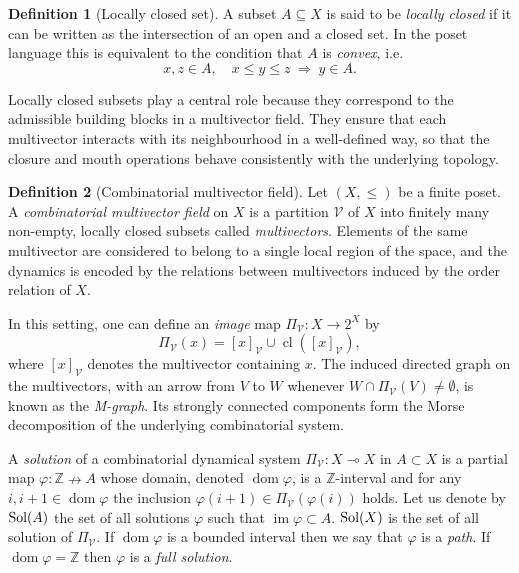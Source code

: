 \documentclass{article}
\theoremstyle{definition}
\newtheorem{definition}{Definition}
\theoremstyle{plain}
\theoremstyle{remark}
\newcommand{\1}{\mathbbm{1}}  %
\newcommand{\img}{\operatorname{im}}
\def\mathobj#1{\mbox{$#1$}}
\def\ZZ{\mathobj{\mathbb{Z}}}
\newcommand{\dom}{\operatorname{dom}}
\def\cV{\text{$\mathcal V$}}
\begin{document}
\begin{definition}[Locally closed set]\cite{lipinski2019conley}
A subset $A\subseteq X$ is said to be \emph{locally closed} if it can be
written as the intersection of an open and a closed set.  In the poset
language this is equivalent to the condition that $A$ is
\emph{convex}, i.e.
\[
x,z\in A,\quad x\leq y\leq z \ \Rightarrow\ y\in A.
\]
\end{definition}

Locally closed subsets play a central role because they correspond to
the admissible building blocks in a multivector field.  They ensure that
each multivector interacts with its neighbourhood in a well-defined way,
so that the closure and mouth operations behave consistently with the
underlying topology.

\begin{definition}[Combinatorial multivector field]\cite{lipinski2019conley}
Let $(X,\leq)$ be a finite poset.  A \emph{combinatorial multivector
field} on $X$ is a partition $\mathcal{V}$ of $X$ into finitely many
non-empty, locally closed subsets called \emph{multivectors}.
Elements of the same multivector are considered to belong to a single
local region of the space, and the dynamics is encoded by the relations
between multivectors induced by the order relation of $X$.
\end{definition}

In this setting, one can define an \emph{image} map
$\Pi_{\mathcal{V}}: X\to 2^{X}$ by
\[
\Pi_{\mathcal{V}}(x)= [x]_{\mathcal{V}}\cup \operatorname{cl}([x]_{\mathcal{V}}),
\]
where $[x]_{\mathcal{V}}$ denotes the multivector containing $x$.  The
induced directed graph on the multivectors, with an arrow from $V$ to
$W$ whenever $W\cap\Pi_{\mathcal{V}}(V)\neq\emptyset$, is known as the
\emph{M-graph}.  Its strongly connected components form the Morse
decomposition of the underlying combinatorial system.



A \emph{solution} of a combinatorial dynamical system $\Pi_\cV:X\multimap X$ in $A\subset X$ is a partial map $\varphi:\mathbb{Z}\nrightarrow A$ whose domain, denoted $\dom \varphi$,  is a $\mathbb{Z}$-interval and for any $i,i+1\in \dom \varphi$ the inclusion $\varphi(i+1)\in \Pi_\cV(\varphi(i))$ holds. Let us denote by $\textup{Sol}(A)$ the set of all solutions $\varphi$ such that $\img\varphi\subset A$. $\textup{Sol}(X)$ is the set of all solution of $\Pi_\cV$.
If $\dom\varphi$ is a bounded interval then we say that $\varphi$ is a \emph{path}.
If $\dom\varphi=\ZZ$ then $\varphi$ is a \emph{full solution}. 
\end{document}
